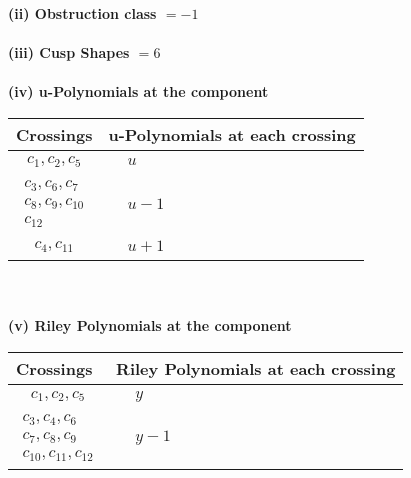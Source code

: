 \documentclass[1p]{elsarticle_modified}
\theoremstyle{definition}
\begin{document}
\flushleft \textbf{(ii) Obstruction class $= -1$}\\~\\
\flushleft \textbf{(iii) Cusp Shapes $= 6$}\\~\\
\newpage\renewcommand{\arraystretch}{1}
\flushleft \textbf{(iv) u-Polynomials at the component}\newline \\
\begin{tabular}{m{50pt}|m{274pt}}
Crossings & \hspace{64pt}u-Polynomials at each crossing \\
\hline $$\begin{aligned}c_{1},c_{2},c_{5}\end{aligned}$$&$\begin{aligned}
&u
\end{aligned}$\\
\hline $$\begin{aligned}c_{3},c_{6},c_{7}\\c_{8},c_{9},c_{10}\\c_{12}\end{aligned}$$&$\begin{aligned}
&u-1
\end{aligned}$\\
\hline $$\begin{aligned}c_{4},c_{11}\end{aligned}$$&$\begin{aligned}
&u+1
\end{aligned}$\\
\hline
\end{tabular}\\~\\
\newpage\renewcommand{\arraystretch}{1}
\flushleft \textbf{(v) Riley Polynomials at the component}\newline \\
\begin{tabular}{m{50pt}|m{274pt}}
Crossings & \hspace{64pt}Riley Polynomials at each crossing \\
\hline $$\begin{aligned}c_{1},c_{2},c_{5}\end{aligned}$$&$\begin{aligned}
&y
\end{aligned}$\\
\hline $$\begin{aligned}c_{3},c_{4},c_{6}\\c_{7},c_{8},c_{9}\\c_{10},c_{11},c_{12}\end{aligned}$$&$\begin{aligned}
&y-1
\end{aligned}$\\
\hline
\end{tabular}\\~\\
\end{document}
